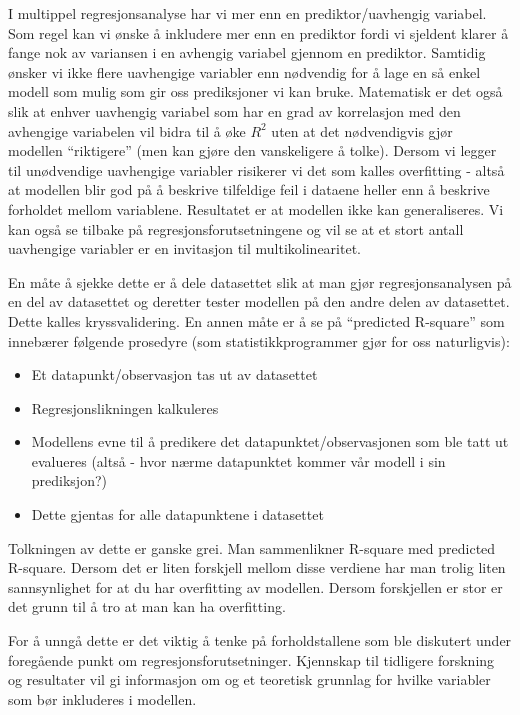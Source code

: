\documentclass[
]{article}
\providecommand{\tightlist}{%
  \setlength{\itemsep}{0pt}\setlength{\parskip}{0pt}}
\begin{document}
I multippel regresjonsanalyse har vi mer enn en prediktor/uavhengig variabel. Som regel kan vi ønske å inkludere mer enn en prediktor fordi vi sjeldent klarer å fange nok av variansen i en avhengig variabel gjennom en prediktor. Samtidig ønsker vi ikke flere uavhengige variabler enn nødvendig for å lage en så enkel modell som mulig som gir oss prediksjoner vi kan bruke. Matematisk er det også slik at enhver uavhengig variabel som har en grad av korrelasjon med den avhengige variabelen vil bidra til å øke \(R^2\) uten at det nødvendigvis gjør modellen ``riktigere'' (men kan gjøre den vanskeligere å tolke). Dersom vi legger til unødvendige uavhengige variabler risikerer vi det som kalles overfitting - altså at modellen blir god på å beskrive tilfeldige feil i dataene heller enn å beskrive forholdet mellom variablene. Resultatet er at modellen ikke kan generaliseres. Vi kan også se tilbake på regresjonsforutsetningene og vil se at et stort antall uavhengige variabler er en invitasjon til multikolinearitet.

En måte å sjekke dette er å dele datasettet slik at man gjør regresjonsanalysen på en del av datasettet og deretter tester modellen på den andre delen av datasettet. Dette kalles kryssvalidering. En annen måte er å se på ``predicted R-square'' som innebærer følgende prosedyre (som statistikkprogrammer gjør for oss naturligvis):

\begin{itemize}
\tightlist
\item
  Et datapunkt/observasjon tas ut av datasettet
\item
  Regresjonslikningen kalkuleres
\item
  Modellens evne til å predikere det datapunktet/observasjonen som ble tatt ut evalueres (altså - hvor nærme datapunktet kommer vår modell i sin prediksjon?)
\item
  Dette gjentas for alle datapunktene i datasettet
\end{itemize}

Tolkningen av dette er ganske grei. Man sammenlikner R-square med predicted R-square. Dersom det er liten forskjell mellom disse verdiene har man trolig liten sannsynlighet for at du har overfitting av modellen. Dersom forskjellen er stor er det grunn til å tro at man kan ha overfitting.

For å unngå dette er det viktig å tenke på forholdstallene som ble diskutert under foregående punkt om regresjonsforutsetninger. Kjennskap til tidligere forskning og resultater vil gi informasjon om og et teoretisk grunnlag for hvilke variabler som bør inkluderes i modellen.
\end{document}
